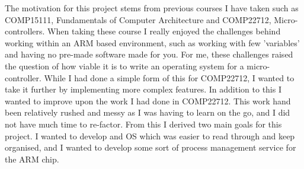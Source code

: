 The motivation for this project stems from previous courses I have taken such as COMP15111, Fundamentals of Computer Architecture and COMP22712, Micro-controllers. When taking these course I really enjoyed the challenges behind working within an ARM based environment, such as working with few 'variables' and having no pre-made software made for you. For me, these challenges raised the question of how viable it is to write an operating system for a micro-controller. While I had done a simple form of this for COMP22712, I wanted to take it further by implementing more complex features. In addition to this I wanted to improve upon the work I had done in COMP22712. This work hand been relatively rushed and messy as I was having to learn on the go, and I did not have much time to re-factor. From this I derived two main goals for this project. I wanted to develop and OS which was easier to read through and keep organised, and I wanted to develop some sort of process management service for the ARM chip. 